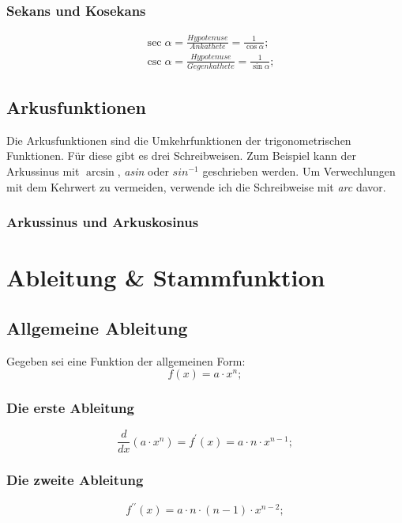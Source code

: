 \documentclass[a4paper]{article}
\begin{document}
\subsubsection{Sekans und Kosekans}
\begin{align*}
	&\sec{\alpha} = \frac{Hypotenuse}{Ankathete} = \frac{1}{\cos{\alpha}} ;
	\\
	&\csc{\alpha} = \frac{Hypotenuse}{Gegenkathete} = \frac{1}{\sin{\alpha}} ;
\end{align*}

\subsection{Arkusfunktionen}
Die Arkusfunktionen sind die Umkehrfunktionen der trigonometrischen Funktionen. Für diese gibt es drei Schreibweisen. Zum Beispiel kann der Arkussinus mit $ \arcsin $, \textit{asin} oder $ sin^{-1} $ geschrieben werden. Um Verwechlungen mit dem Kehrwert zu vermeiden, verwende ich die Schreibweise mit \textit{arc} davor.

\subsubsection{Arkussinus und Arkuskosinus}



\section{Ableitung \& Stammfunktion}

\subsection{Allgemeine Ableitung}

Gegeben sei eine Funktion der allgemeinen Form:
\[
	 f(x) = a \cdot x^n ; 
\]

\subsubsection{Die erste Ableitung}
\[
	\frac{d}{dx} \left( a \cdot x^n \right) = f^\prime(x) = a \cdot n \cdot x^{n - 1} ;
\]

\subsubsection{Die zweite Ableitung}
\[
	f^{\prime\prime}(x) = a \cdot n \cdot \left( n - 1 \right) \cdot x^{n - 2} ;
\]
\end{document}
